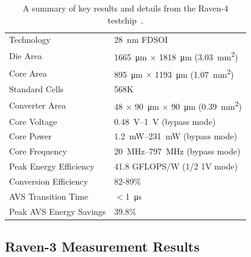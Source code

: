 \documentclass[graybox]{svmult}
\begin{document}
\begin{table}[]
\footnotesize
\renewcommand{\arraystretch}{1.2}
\centering
\begin{tabular}{@{}ll@{}}
\toprule
Technology & \SI{28}{\nano\meter} FDSOI\\
Die Area & \SI{1665}{\micro\meter} $\times$ \SI{1818}{\micro\meter} (\SI{3.03}{\milli\meter\squared})\\
Core Area & \SI{895}{\micro\meter} $\times$ \SI{1193}{\micro\meter} (\SI{1.07}{\milli\meter\squared})\\
Standard Cells & 568K \\
Converter Area & 48 $\times$ \SI{90}{\micro\meter} $\times$ \SI{90}{\micro\meter} (\SI{0.39}{\milli\meter\squared})\\
Core Voltage & \SIrange{0.48}{1}{\volt} (bypass mode)\\
Core Power & \SIrange{1.2}{231}{\milli\watt} (bypass mode)\\
Core Frequency & \SIrange{20}{797}{\mega\hertz} (bypass mode)\\
Peak Energy Efficiency & 41.8 GFLOPS/W (1/2 1V mode)\\
Conversion Efficiency & 82-89\%\\
AVS Transition Time & $<$\SI{1}{\micro\second}\\
Peak AVS Energy Savings & 39.8\%\\
\bottomrule
\end{tabular}
\caption{A summary of key results and details from the Raven-4 testchip~\cite{Keller2017}.}
\label{tab:raven4-summary}
\end{table}


\subsection{Raven-3 Measurement Results}

\end{document}
